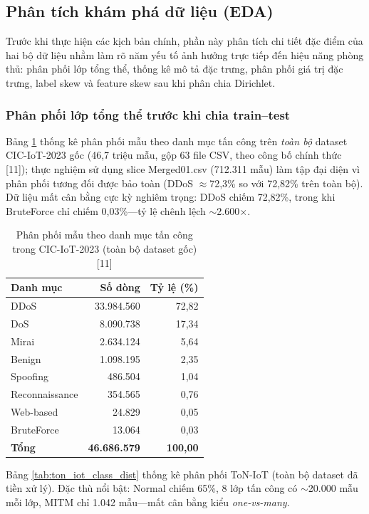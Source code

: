 \subsection{Phân tích khám phá dữ liệu (EDA)}
\label{sec:eda}
Trước khi thực hiện các kịch bản chính, phần này phân tích chi tiết đặc điểm của hai bộ dữ liệu nhằm làm rõ năm yếu tố ảnh hưởng trực tiếp đến hiệu năng phòng thủ: phân phối lớp tổng thể, thống kê mô tả đặc trưng, phân phối giá trị đặc trưng, label skew và feature skew sau khi phân chia Dirichlet.

\subsubsection{Phân phối lớp tổng thể trước khi chia train--test}
Bảng \ref{tab:cic_class_dist} thống kê phân phối mẫu theo danh mục tấn công trên \textit{toàn bộ} dataset CIC-IoT-2023 gốc (46,7 triệu mẫu, gộp 63 file CSV, theo công bố chính thức {[}11{]}); thực nghiệm sử dụng slice Merged01.csv (712.311 mẫu) làm tập đại diện vì phân phối tương đối được bảo toàn (DDoS $\approx$72,3\% so với 72,82\% trên toàn bộ). Dữ liệu mất cân bằng cực kỳ nghiêm trọng: DDoS chiếm 72,82\%, trong khi BruteForce chỉ chiếm 0,03\%---tỷ lệ chênh lệch $\sim$2.600$\times$.

\begin{table}[H]
\centering
\caption{Phân phối mẫu theo danh mục tấn công trong CIC-IoT-2023 (toàn bộ dataset gốc) {[}11{]}}
\label{tab:cic_class_dist}
\small
\begin{tabular}{|l|r|r|}
\hline
\textbf{Danh mục} & \textbf{Số dòng} & \textbf{Tỷ lệ (\%)} \\
\hline
DDoS & 33.984.560 & 72,82 \\
\hline
DoS & 8.090.738 & 17,34 \\
\hline
Mirai & 2.634.124 & 5,64 \\
\hline
Benign & 1.098.195 & 2,35 \\
\hline
Spoofing & 486.504 & 1,04 \\
\hline
Reconnaissance & 354.565 & 0,76 \\
\hline
Web-based & 24.829 & 0,05 \\
\hline
BruteForce & 13.064 & 0,03 \\
\hline
\textbf{Tổng} & \textbf{46.686.579} & \textbf{100,00} \\
\hline
\end{tabular}
\end{table}

Bảng \ref{tab:ton_iot_class_dist} thống kê phân phối ToN-IoT (toàn bộ dataset đã tiền xử lý). Đặc thù nổi bật: Normal chiếm 65\%, 8 lớp tấn công có $\sim$20.000 mẫu mỗi lớp, MITM chỉ 1.042 mẫu---mất cân bằng kiểu \textit{one-vs-many}.

